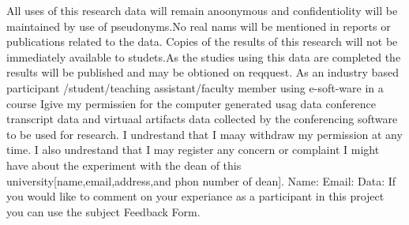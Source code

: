 \documentclass[a4paper]{book}
\begin{document}
All uses of this research data will remain anoonymous and confidentiolity will be maintained by use of pseudonyms.No real nams will be mentioned in reports or publications related to the data.
Copies of the results of this research will not be immediately available to studets.As the studies using this data are completed the results will be published and may be obtioned on reqquest.
As an industry based participant /student/teaching assistant/faculty member using e-soft-ware in a course Igive my permissien for the computer generated usag data conference transcript data and virtuaal artifacts data collected by the conferencing software to be used for research.
I undrestand that I maay withdraw my permission at any time. I also undrestand that I may register any concern or complaint I might have about the experiment with the dean of this university[name,email,address,and phon number of dean].
Name:
Email:
Data:
If you would like to comment on your experiance as a participant in this project you can use the subject Feedback Form.
\end{document}
